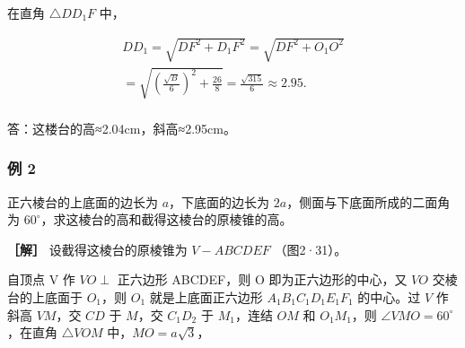 在直角 \(\triangle DD_{1}F\) 中，

\[
\begin{array}{l} D D _ {1} = \sqrt {D F ^ {2} + D _ {1} F ^ {2}} = \sqrt {D F ^ {2} + O _ {1} O ^ {2}} \\ = \sqrt {\left(\frac {\sqrt {B}}{6}\right) ^ {2} + \frac {26}{8}} = \frac {\sqrt {315}}{6} \approx 2.95. \\ \end{array}
\]

答：这楼台的高≈2.04cm，斜高≈2.95cm。

\subsubsection{例 2}

正六棱台的上底面的边长为 \(a\)，下底面的边长为
\(2a\)，侧面与下底面所成的二面角为
\(60^{\circ}\)，求这棱台的高和截得这棱台的原棱锥的高。

\textbf{［解］} 设截得这棱台的原棱锥为 \(V - ABCDEF\) （图2·31）。

自顶点 V 作 \(VO \perp\) 正六边形 ABCDEF，则 O 即为正六边形的中心，又
\(VO\) 交棱台的上底面于 \(O_{1}\)，则 \(O_{1}\) 就是上底面正六边形
\(A_{1}B_{1}C_{1}D_{1}E_{1}F_{1}\) 的中心。过 \(V\) 作斜高 \(VM\)，交
\(CD\) 于 \(M\)，交 \(C_{1}D_{2}\) 于 \(M_{1}\)，连结 \(OM\) 和
\(O_{1}M_{1}\)，则 \(\angle VMO = 60^{\circ}\)，在直角 \(\triangle VOM\)
中，\(MO = a\sqrt{3}\)，

